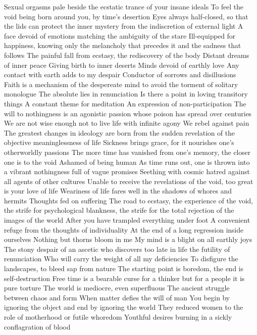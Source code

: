 \documentclass{article}
\begin{document}
Sexual orgasms pale beside the ecstatic trance of your insane ideals
To feel the void being born around you, by time's desertion
Eyes always half-closed, so that the lids can protect the inner mystery from the indiscretion of external light
A face devoid of emotions matching the ambiguity of the stare
Ill-equipped for happiness, knowing only the melancholy that precedes it and the sadness that follows
The painful fall from ecstasy, the rediscovery of the body
Distant dreams of inner peace
Giving birth to inner deserts
Minds devoid of earthly love
Any contact with earth adds to my despair
Conductor of sorrows and disillusions
Faith is a mechanism of the despereate mind to avoid the torment of solitary monologue
The absolute lies in renunciation
Is there a point in loving transitory things
A constant theme for meditation
An expression of non-participation
The will to nothingness is an agonistic passion whose poison has spread over centuries
We are not wise enough not to live life with infinite agony
We rebel against pain
The greatest changes in ideology are born from the sudden revelation of the objective meaninglessness of life 
Sickness brings grace, for it nourishes one's otherworldly passions
The more time has vanished from one's memory, the closer one is to the void
Ashamed of being human
As time runs out, one is thrown into a vibrant nothingness full of vague promises
Seething with cosmic hatred against all agents of other cultures
Unable to receive the revelations of the void, too great is your love of life
Weariness of life fares well in the shadows of whores and hermits
Thoughts fed on suffering
The road to ecstasy, the experience of the void, the strife for psychological blankness, the strife for the total rejection of the images of the world
After you have trampled everything under foot
A convenient refuge from the thoughts of individuality
At the end of a long regression inside ourselves
Nothing but thorns bloom in me
My mind is a blight on all earthly joys
The stony despair of an ascetic who discovers too late in life the futility of renunciation
Who will carry the weight of all my deficiencies
To disfigure the landscapes, to bleed sap from nature
The starting point is boredom, the end is self-destruction
Free time is a bearable curse for a thinker but for a people it is pure torture
The world is mediocre, even superfluous
The ancient struggle between chaos and form
When matter defies the will of man
You begin by ignoring the object and end by ignoring the world
They reduced women to the role of motherhood or futile whoredom
Youthful desires burning in a sickly conflagration of blood
\end{document}
